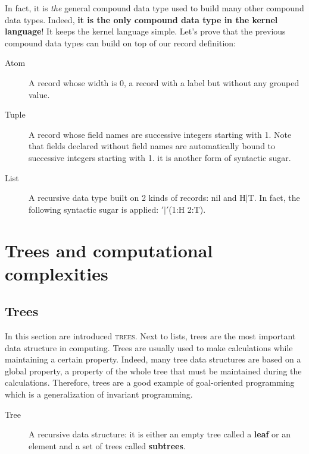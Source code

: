 \documentclass[11pt,a4paper,twoside,openright]{report}
\begin{document}
In fact, it is \textit{the} general compound data type used to build many other 
compound data types. Indeed, \textbf{it is the only compound data type in the 
kernel language}! It keeps the kernel language simple. Let's prove that the previous 
compound data types can build on top of our record definition:

\begin{description}
	\item[Atom] A record whose width is 0, a record with a label but 
without any grouped value.
	\item[Tuple] A record whose field names are successive integers 
starting with 1. Note that fields declared without field names are 
automatically 
bound to successive integers starting with 1. it is another form of syntactic 
sugar.
	\item[List] A recursive data type built on 2 kinds of records: nil and 
H$|$T. In fact, the following syntactic sugar is applied: $'|'$(1:H 2:T).
\end{description}


\section {Trees and computational complexities}

\subsection{Trees}

In this section are introduced \textsc{trees}. Next to lists, trees are the 
most important data structure in computing. Trees are usually used to make 
calculations while maintaining a certain property. Indeed, many tree data 
structures are based on a global property, a property of the whole tree that 
must be maintained during the calculations. Therefore, trees are a good example 
of goal-oriented programming which is a generalization of invariant programming.

\begin{description}
 \item[Tree] A recursive data structure: it is either an empty tree called a 
\textbf{leaf} or an element and a set of trees called \textbf{subtrees}.
\end{description}
\end{document}

